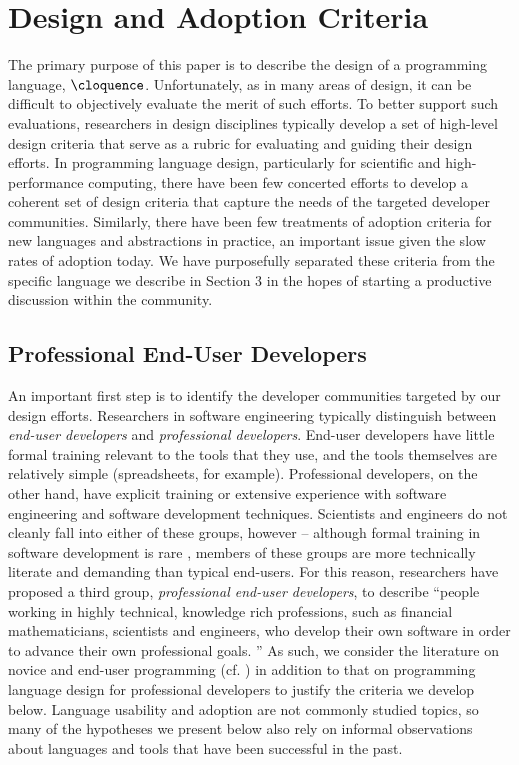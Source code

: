 \section{Design and Adoption Criteria}
The primary purpose of this paper is to describe the design of a programming language, $\cloquence$. Unfortunately, as in many areas of design, it can be difficult to objectively evaluate the merit of such efforts. To better support such evaluations, researchers in design disciplines typically develop a set of high-level  design criteria that serve as a rubric for evaluating and guiding their design efforts. In programming language design, particularly for scientific and high-performance computing, there have been few concerted efforts to develop a coherent set of design criteria that capture the needs of the targeted developer communities. Similarly, there have been few treatments of adoption criteria for new languages and abstractions in practice, an important issue given the slow rates of adoption today. We have purposefully separated these criteria from the specific language we describe in Section 3 in the hopes of starting a productive discussion within the community.

\subsection{Professional End-User Developers}
An important first step is to identify the developer communities targeted by our design efforts. Researchers in software engineering typically distinguish between {\it end-user developers} and {\it professional developers}. End-user developers have little formal training relevant to the tools that they use, and the tools themselves are relatively simple (spreadsheets, for example). Professional developers, on the other hand, have explicit training or extensive experience with software engineering and software development techniques. Scientists and engineers do not cleanly fall into either of these groups, however -- although formal training in software development is rare \cite{oai:open.ac.uk.OAI2:17673}, members of these groups are more technically literate and demanding than typical end-users. For this reason, researchers have proposed a third group, {\it professional end-user developers}, to describe ``people working in highly technical, knowledge rich professions, such as financial mathematicians, scientists and engineers, who develop their own software in order to advance their own professional goals. \cite{segal2007some}'' 
As such, we consider the literature on novice and end-user programming (cf. \cite{pane1996usability}) in addition to that on programming language design for professional developers to justify the criteria we develop below. Language usability and adoption are not commonly studied topics, so many of the hypotheses we present below also rely on informal observations about languages and tools that have been successful in the past.

